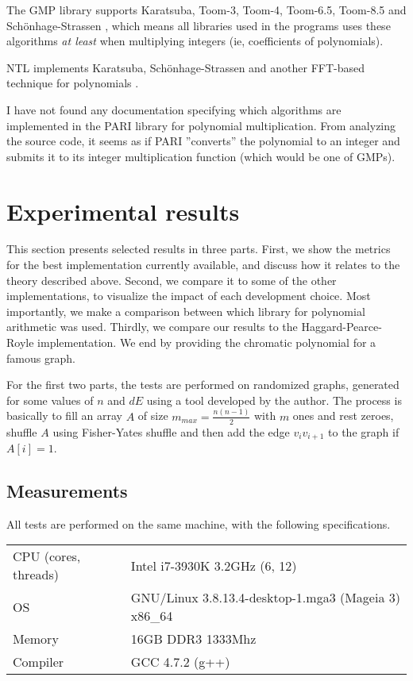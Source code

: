 \documentclass[a4paper]{article}
\begin{document}
The GMP library supports Karatsuba, Toom-3, Toom-4, Toom-6.5, Toom-8.5 and Schönhage-Strassen \cite[p 90]{gmp}, which means all libraries used in the programs uses these algorithms \emph{at least} when multiplying integers (ie, coefficients of polynomials).

NTL implements Karatsuba, Schönhage-Strassen and another FFT-based technique for polynomials \cite{ntl_zzx}.

I have not found any documentation specifying which algorithms are implemented in the PARI library for polynomial multiplication. From analyzing the source code, it seems as if PARI ''converts'' the polynomial to an integer and submits it to its integer multiplication function (which would be one of GMPs).

\section{Experimental results}
This section presents selected results in three parts. First, we show the metrics for the best implementation currently available, and discuss how it relates to the theory described above. Second, we compare it to some of the other implementations, to visualize the impact of each development choice. Most importantly, we make a comparison between which library for polynomial arithmetic was used. Thirdly, we compare our results to the Haggard-Pearce-Royle implementation. \cite{haggard} 
We end by providing the chromatic polynomial for a famous graph.

For the first two parts, the tests are performed on randomized graphs, generated for some values of $n$ and $dE$ using a tool developed by the author. The process is basically to fill an array $A$ of size $m_{max} = \frac{n(n-1)}{2}$ with $m$ ones and rest zeroes, shuffle $A$ using Fisher-Yates shuffle and then add the edge $v_iv_{i+1}$ to the graph if $A[i] = 1$.

\subsection{Measurements}
All tests are performed on the same machine, with the following specifications.

\begin{center}
\begin{tabular}{l|l}
CPU (cores, threads) & Intel i7-3930K 3.2GHz (6, 12) \\ 
OS & GNU/Linux 3.8.13.4-desktop-1.mga3 (Mageia 3) x86\_64 \\ 
Memory & 16GB DDR3 1333Mhz \\ 
Compiler & GCC 4.7.2 (g++) \\ 
\end{tabular}
\end{center}
\end{document}
